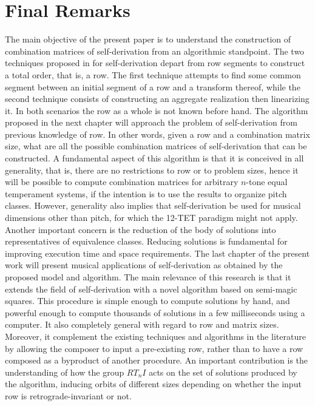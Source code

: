 \section{Final Remarks}

The main objective of the present paper is to understand the construction of combination matrices of self-derivation from an algorithmic standpoint. The two techniques proposed in \cite{Starr1984} for self-derivation depart from row segments to construct a total order, that is, a row. The first technique attempts to find some common segment between an initial segment of a row and a transform thereof, while the second technique consists of constructing an aggregate realization then linearizing it. In both scenarios the row as a whole is not known before hand. The algorithm proposed in the next chapter will approach the problem of self-derivation from previous knowledge of row. In other words, given a row and a combination matrix size, what are all the possible combination matrices of self-derivation that can be constructed. A fundamental aspect of this algorithm is that it is conceived in all generality, that is, there are no restrictions to row or to problem sizes, hence it will be possible to compute combination matrices for arbitrary $n$-tone equal temperament systems, if the intention is to use the results to organize pitch classes. However, generality also implies that self-derivation be used for musical dimensions other than pitch, for which the 12-TET paradigm might not apply. Another important concern is the reduction of the body of solutions into representatives of equivalence classes. Reducing solutions is fundamental for improving execution time and space requirements. The last chapter of the present work will present musical applications of self-derivation as obtained by the proposed model and algorithm. The main relevance of this research is that it extends the field of self-derivation with a novel algorithm based on semi-magic squares. This procedure is simple enough to compute solutions by hand, and powerful enough to compute thousands of solutions in a few milliseconds using a computer. It also completely general with regard to row and matrix sizes. Moreover, it complement the existing techniques and algorithms in the literature by allowing the composer to input a pre-existing row, rather than to have a row composed as a byproduct of another procedure. An important contribution is the understanding of how the group $RT_nI$ acts on the set of solutions produced by the algorithm, inducing orbits of different sizes depending on whether the input row is retrograde-invariant or not.

